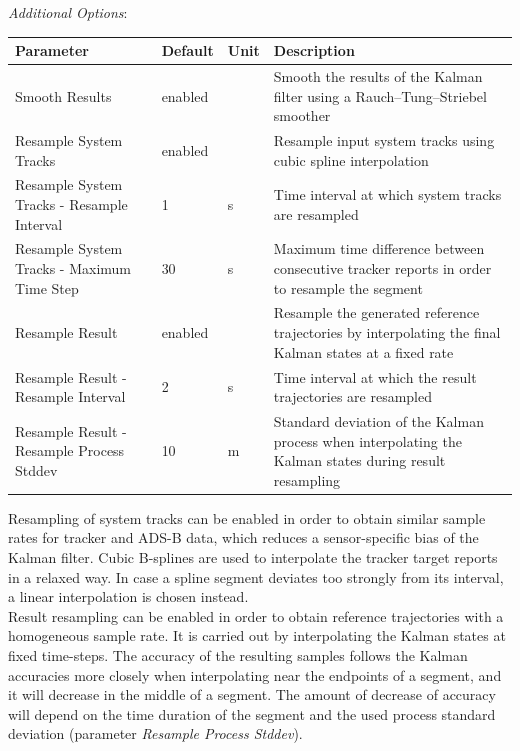 \textit{Additional Options}:
\begin{table}[H]
    \center
    \begin{tabularx}{\textwidth}{ | X | l | l | X |}
        \hline
        \textbf{Parameter} & \textbf{Default} & \textbf{Unit} & \textbf{Description} \\ \hline
        Smooth Results & enabled & & Smooth the results of the Kalman filter using a Rauch–Tung–Striebel smoother \\ \hline
        Resample System Tracks & enabled & & Resample input system tracks using cubic spline interpolation \\ \hline
        Resample System Tracks - Resample Interval & 1 & s & Time interval at which system tracks are resampled \\ \hline
        Resample System Tracks - Maximum Time Step & 30 & s & Maximum time difference between consecutive tracker 
            reports in order to resample the segment \\ \hline
        Resample Result & enabled & & Resample the generated reference trajectories by interpolating the final Kalman states
            at a fixed rate \\ \hline
        Resample Result - Resample Interval & 2 & s & Time interval at which the result trajectories are resampled \\ \hline
        Resample Result - Resample Process Stddev & 10 & m & Standard deviation of the Kalman process when interpolating the 
            Kalman states during result resampling \\ \hline
    \end{tabularx}
\end{table}

Resampling of system tracks can be enabled in order to obtain similar sample rates for tracker and ADS-B
data, which reduces a sensor-specific bias of the Kalman filter. Cubic B-splines are used to interpolate the tracker target
reports in a relaxed way. In case a spline segment deviates too strongly from its interval, a linear interpolation is 
chosen instead. \\

Result resampling can be enabled in order to obtain reference trajectories with a homogeneous sample rate. 
It is carried out by interpolating the Kalman states at fixed time-steps. The accuracy of the resulting samples
follows the Kalman accuracies more closely when interpolating near the endpoints of a segment, and it will decrease
in the middle of a segment. The amount of decrease of accuracy will depend on the time duration of the segment and the used 
process standard deviation (parameter \textit{Resample Process Stddev}).

